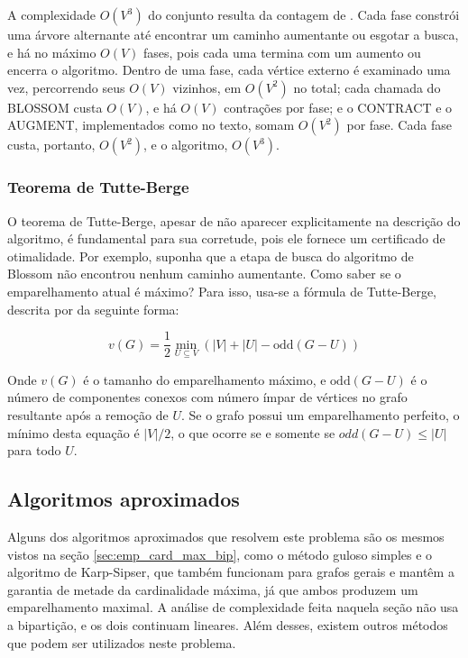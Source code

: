 A complexidade $O(V^3)$ do conjunto resulta da contagem de . Cada fase constrói uma árvore alternante até encontrar um caminho aumentante ou esgotar a busca, e há no máximo $O(V)$ fases, pois cada uma termina com um aumento ou encerra o algoritmo. Dentro de uma fase, cada vértice externo é examinado uma vez, percorrendo seus $O(V)$ vizinhos, em $O(V^2)$ no total; cada chamada do BLOSSOM custa $O(V)$, e há $O(V)$ contrações por fase; e o CONTRACT e o AUGMENT, implementados como no texto, somam $O(V^2)$ por fase. Cada fase custa, portanto, $O(V^2)$, e o algoritmo, $O(V^3)$.

\subsubsection{Teorema de Tutte-Berge}

O teorema de Tutte-Berge, apesar de não aparecer explicitamente na descrição do algoritmo, é fundamental para sua corretude, pois ele fornece um certificado de otimalidade. Por exemplo, suponha que a etapa de busca do algoritmo de Blossom não encontrou nenhum caminho aumentante. Como saber se o emparelhamento atual é máximo? Para isso, usa-se a fórmula de Tutte-Berge, descrita por  da seguinte forma:

\begin{equation}
    v(G) = \frac{1}{2} \min_{U \subseteq V} (|V| + |U| - \mathrm{odd}(G - U))
\end{equation}

Onde $v(G)$ é o tamanho do emparelhamento máximo, e $\mathrm{odd}(G - U)$ é o número de componentes conexos com número ímpar de vértices no grafo resultante após a remoção de $U$. Se o grafo possui um emparelhamento perfeito, o mínimo desta equação é $|V|/2$, o que ocorre se e somente se $odd(G-U) \le |U|$ para todo $U$.

\subsection{Algoritmos aproximados}

Alguns dos algoritmos aproximados que resolvem este problema são os mesmos vistos na seção \ref{sec:emp_card_max_bip}, como o método guloso simples e o algoritmo de Karp-Sipser, que também funcionam para grafos gerais e mantêm a garantia de metade da cardinalidade máxima, já que ambos produzem um emparelhamento maximal. A análise de complexidade feita naquela seção não usa a bipartição, e os dois continuam lineares. Além desses, existem outros métodos que podem ser utilizados neste problema.

